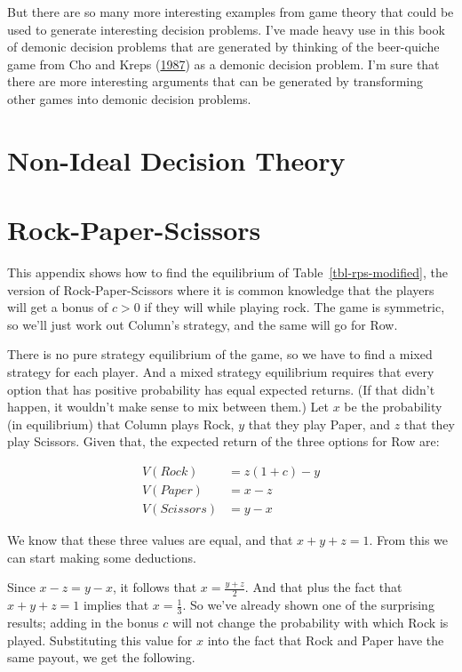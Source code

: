 \documentclass[
  12pt,
  letterpaper,
  DIV=11,
  numbers=noendperiod]{scrreprt}
\begin{document}
But there are so many more interesting examples from game theory that
could be used to generate interesting decision problems. I've made heavy
use in this book of demonic decision problems that are generated by
thinking of the beer-quiche game from Cho and Kreps
(\protect\hyperlink{ref-ChoKreps1987}{1987}) as a demonic decision
problem. I'm sure that there are more interesting arguments that can be
generated by transforming other games into demonic decision problems.

\hypertarget{sec-nidt}{%
\chapter{Non-Ideal Decision Theory}\label{sec-nidt}}

\hypertarget{sec-rps}{%
\chapter{Rock-Paper-Scissors}\label{sec-rps}}

This appendix shows how to find the equilibrium of
Table~\ref{tbl-rps-modified}, the version of Rock-Paper-Scissors where
it is common knowledge that the players will get a bonus of \(c > 0\) if
they will while playing rock. The game is symmetric, so we'll just work
out Column's strategy, and the same will go for Row.

There is no pure strategy equilibrium of the game, so we have to find a
mixed strategy for each player. And a mixed strategy equilibrium
requires that every option that has positive probability has equal
expected returns. (If that didn't happen, it wouldn't make sense to mix
between them.) Let \(x\) be the probability (in equilibrium) that Column
plays Rock, \(y\) that they play Paper, and \(z\) that they play
Scissors. Given that, the expected return of the three options for Row
are:

\begin{align*}
V(Rock) &= z(1+c) - y \\
V(Paper) &= x - z \\
V(Scissors) &= y - x
\end{align*}

We know that these three values are equal, and that \(x+y+z=1\). From
this we can start making some deductions.

Since \(x-z=y-x\), it follows that \(x=\frac{y+z}{2}\). And that plus
the fact that \(x+y+z=1\) implies that \(x=\frac{1}{3}\). So we've
already shown one of the surprising results; adding in the bonus \(c\)
will not change the probability with which Rock is played. Substituting
this value for \(x\) into the fact that Rock and Paper have the same
payout, we get the following.
\end{document}
